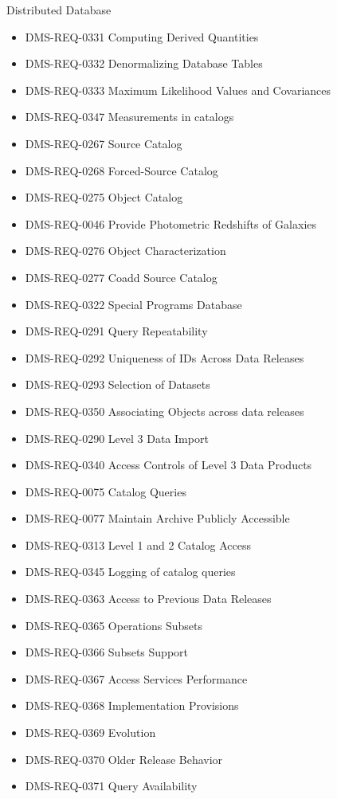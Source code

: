 Distributed Database \begin{itemize}
\item DMS-REQ-0331 Computing Derived Quantities
\item DMS-REQ-0332 Denormalizing Database Tables
\item DMS-REQ-0333 Maximum Likelihood Values and Covariances
\item DMS-REQ-0347 Measurements in catalogs
\item DMS-REQ-0267 Source Catalog
\item DMS-REQ-0268 Forced-Source Catalog
\item DMS-REQ-0275 Object Catalog
\item DMS-REQ-0046 Provide Photometric Redshifts of Galaxies
\item DMS-REQ-0276 Object Characterization
\item DMS-REQ-0277 Coadd Source Catalog
\item DMS-REQ-0322 Special Programs Database
\item DMS-REQ-0291 Query Repeatability
\item DMS-REQ-0292 Uniqueness of IDs Across Data Releases
\item DMS-REQ-0293 Selection of Datasets
\item DMS-REQ-0350 Associating Objects across data releases
\item DMS-REQ-0290 Level 3 Data Import
\item DMS-REQ-0340 Access Controls of Level 3 Data Products
\item DMS-REQ-0075 Catalog Queries
\item DMS-REQ-0077 Maintain Archive Publicly Accessible
\item DMS-REQ-0313 Level 1 and 2 Catalog Access
\item DMS-REQ-0345 Logging of catalog queries
\item DMS-REQ-0363 Access to Previous Data Releases
\item DMS-REQ-0365 Operations Subsets
\item DMS-REQ-0366 Subsets Support
\item DMS-REQ-0367 Access Services Performance
\item DMS-REQ-0368 Implementation Provisions
\item DMS-REQ-0369 Evolution
\item DMS-REQ-0370 Older Release Behavior
\item DMS-REQ-0371 Query Availability
\end{itemize}

